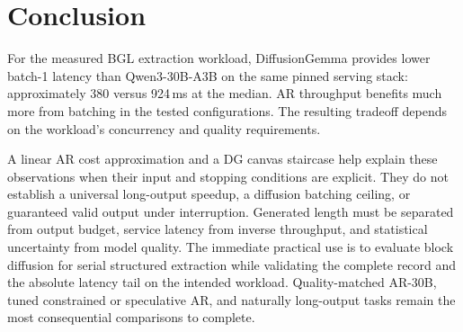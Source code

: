 \section{Conclusion}
\label{sec:conclusion}

For the measured BGL extraction workload, DiffusionGemma provides lower
batch-1 latency than Qwen3-30B-A3B on the same pinned serving stack:
approximately 380 versus 924\,ms at the median. AR throughput benefits
much more from batching in the tested configurations. The resulting
tradeoff depends on the workload's concurrency and quality requirements.

A linear AR cost approximation and a DG canvas staircase help explain
these observations when their input and stopping conditions are explicit.
They do not establish a universal long-output speedup, a diffusion
batching ceiling, or guaranteed valid output under interruption.
Generated length must be separated from output budget, service latency
from inverse throughput, and statistical uncertainty from model quality.
The immediate practical use is to evaluate block diffusion for serial
structured extraction while validating the complete record and the
absolute latency tail on the intended workload. Quality-matched AR-30B,
tuned constrained or speculative AR, and naturally long-output tasks
remain the most consequential comparisons to complete.
